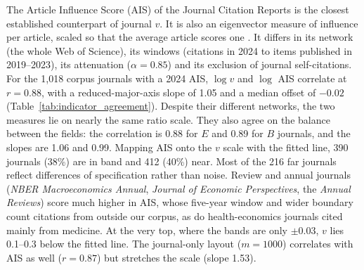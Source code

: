 The Article Influence Score (AIS) of the Journal Citation Reports is the closest established counterpart of journal $v$. It is also an eigenvector measure of influence per article, scaled so that the average article scores one \citep{bergstromEigenfactorMetrics2008}. It differs in its network (the whole Web of Science), its windows (citations in 2024 to items published in 2019--2023), its attenuation ($\alpha=0.85$) and its exclusion of journal self-citations. For the 1,018 corpus journals with a 2024 AIS, $\log v$ and $\log$ AIS correlate at $r=0.88$, with a reduced-major-axis slope of 1.05 and a median offset of $-0.02$ (Table~\ref{tab:indicator_agreement}). Despite their different networks, the two measures lie on nearly the same ratio scale. They also agree on the balance between the fields: the correlation is 0.88 for $E$ and 0.89 for $B$ journals, and the slopes are 1.06 and 0.99. Mapping AIS onto the $v$ scale with the fitted line, 390 journals (38\%) are in band and 412 (40\%) near. Most of the 216 far journals reflect differences of specification rather than noise. Review and annual journals (\textit{NBER Macroeconomics Annual}, \textit{Journal of Economic Perspectives}, the \textit{Annual Reviews}) score much higher in AIS, whose five-year window and wider boundary count citations from outside our corpus, as do health-economics journals cited mainly from medicine. At the very top, where the bands are only $\pm0.03$, $v$ lies 0.1--0.3 below the fitted line. The journal-only layout ($m=1000$) correlates with AIS as well ($r=0.87$) but stretches the scale (slope 1.53).


